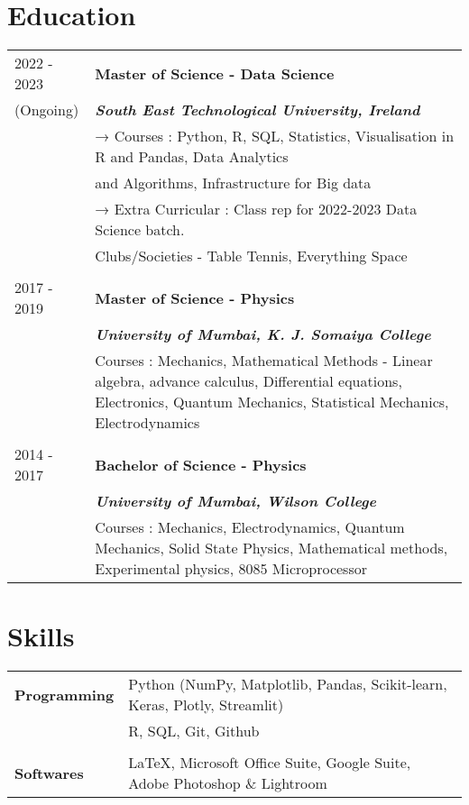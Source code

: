 \documentclass[a4paper,12pt]{article}
\begin{document}
\section{Education}
\begin{tabularx}{\linewidth}{@{}l X@{}}	
	2022 - 2023 & \textbf{Master of Science - Data Science} \\ %
	 (Ongoing) & \textbf{\textit{South East Technological University, Ireland}} \\
	 & → Courses : Python, R, SQL, Statistics, Visualisation in R and Pandas, Data Analytics \\
	 & \hspace{.4cm} and Algorithms, Infrastructure for Big data \\
	 & → Extra Curricular : Class rep for 2022-2023 Data Science batch. \\ 
	 & \hspace{.4cm} Clubs/Societies - Table Tennis, Everything Space\\
	\\
	2017 - 2019 & \textbf{Master of Science - Physics} \\ %
	 & \textbf{\textit{University of Mumbai, K. J. Somaiya College}}\\
	 & Courses : Mechanics, Mathematical Methods - Linear algebra, advance calculus, Differential equations, Electronics, Quantum Mechanics, Statistical Mechanics, Electrodynamics \\
	 \\
	2014 - 2017 &  \textbf{Bachelor of Science - Physics}\\
	& \textbf{\textit{University of Mumbai, Wilson College}}\\
	& Courses : Mechanics, Electrodynamics, Quantum Mechanics, Solid State Physics, Mathematical methods, Experimental physics, 8085 Microprocessor \\
	
\end{tabularx}

\section{Skills}
\begin{tabularx}{\linewidth}{@{}l X@{}}
	\textbf{Programming} &  \normalsize{Python (NumPy, Matplotlib, Pandas, Scikit-learn, Keras, Plotly, Streamlit)} \\
	& R, SQL, Git, Github\\
	&\\
	\textbf{Softwares}  &  \normalsize{\LaTeX, Microsoft Office Suite, Google Suite, Adobe Photoshop \& Lightroom}\\  
\end{tabularx}
\end{document}
